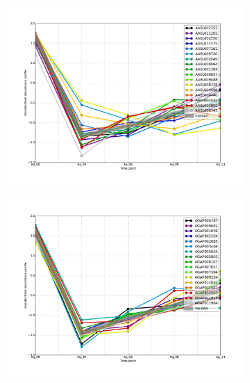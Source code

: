 
\begin{figure}[hp]
% 
\begin{subfigure}[t]{.5\linewidth}
\includegraphics[width=\linewidth]{figures/figs/ecr_and_insects_ptci_20130903/downAt4_gene_profiles_from_cummerbund/Aa_downAt4_cls19_Ag_target_FPKMs_vb_orthos.pdf}
\caption{}
\label{fig:cluster19-Aa}
\end{subfigure}%
%
\begin{subfigure}[t]{.5\linewidth}
\includegraphics[width=\linewidth]{figures/figs/ecr_and_insects_ptci_20130903/downAt4_gene_profiles_from_cummerbund/Ag_downAt4_cls19_Ag_target_FPKMs_vb_orthos.pdf}
\caption{}
\label{fig:cluster19-Ag}
\end{subfigure}
% 
\begin{subfigure}[t]{.5\linewidth}

\end{subfigure}
\end{figure}

